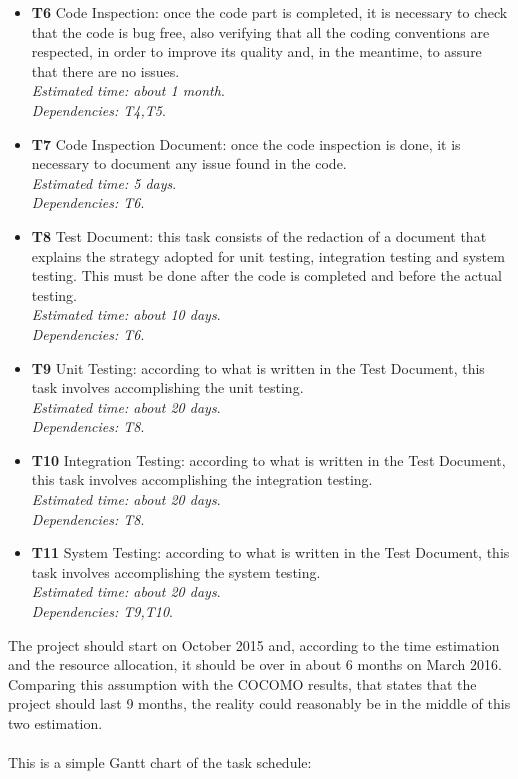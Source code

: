 \documentclass[18pt,oneside,a4paper, titlepage]{article}
\begin{document}
\begin{itemize}
		\item \textbf{T6} Code Inspection: once the code part is completed, it is necessary to check that the code is bug free, also verifying that all the coding conventions are respected, in order to improve its quality and, in the meantime, to assure that there are no issues.\\ \textit{Estimated time: about 1 month}.\\ \textit{Dependencies: T4,T5}.
		\item \textbf{T7} Code Inspection Document: once the code inspection is done, it is necessary to document any issue found in the code.\\ \textit{Estimated time: 5 days}.\\ \textit{Dependencies: T6}.
		\item \textbf{T8} Test Document: this task consists of the redaction of a document that explains the strategy adopted for unit testing, integration testing and system testing. This must be done after the code is completed and before the actual testing.\\ \textit{Estimated time: about 10 days}.\\ \textit{Dependencies: T6}.
		\item \textbf{T9} Unit Testing: according to what is written in the Test Document, this task involves accomplishing the unit testing.\\ \textit{Estimated time: about 20 days}.\\ \textit{Dependencies: T8}.
		\item \textbf{T10} Integration Testing: according to what is written in the Test Document, this task involves accomplishing the integration testing.\\ \textit{Estimated time: about 20 days}.\\ \textit{Dependencies: T8}.
		\item \textbf{T11} System Testing: according to what is written in the  Test Document, this task involves accomplishing the system testing.\\ \textit{Estimated time: about 20 days}.\\ \textit{Dependencies: T9,T10}.
	\end{itemize}
	The project should start on October 2015 and, according to the time estimation and the resource allocation, it should be over in about 6 months on March 2016. Comparing this assumption with the COCOMO results, that states that the project should last 9 months, the reality could reasonably be in the middle of this two estimation.\\ \\ This is a simple Gantt chart of the task schedule:\\
\end{document}
